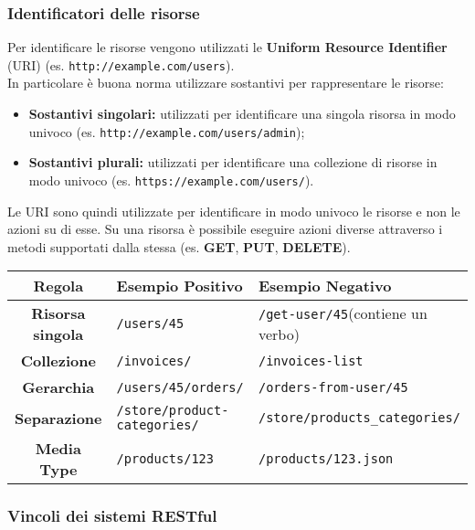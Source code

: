\documentclass[12pt]{article}
\begin{document}
\subsubsection{Identificatori delle risorse}
Per identificare le risorse vengono utilizzati le \textbf{Uniform Resource Identifier} (URI) (es. \texttt{http://example.com/users}).\\
In particolare è buona norma utilizzare sostantivi per rappresentare le risorse:
\begin{itemize}
  \item \textbf{Sostantivi singolari:} utilizzati per identificare una singola risorsa in modo univoco (es. \texttt{http://example.com/users/admin});
  \item \textbf{Sostantivi plurali:} utilizzati per identificare una collezione di risorse in modo univoco (es. \texttt{https://example.com/users/}).
\end{itemize}
Le URI sono quindi utilizzate per identificare in modo univoco le risorse e non le azioni su di esse.
Su una risorsa è possibile eseguire azioni diverse attraverso i metodi supportati dalla stessa (es. \textbf{GET}, \textbf{PUT}, \textbf{DELETE}).
\begin{center}
\begin{tabularx}{\textwidth}{ |c|X|X| }
\hline
\textbf{Regola} & \textbf{Esempio Positivo} & \textbf{Esempio Negativo}\\
\hline\hline
\textbf{Risorsa singola} & \texttt{/users/45} & \texttt{/get-user/45}\newline(contiene un verbo)\\
\hline
\textbf{Collezione} & \texttt{/invoices/} & \texttt{/invoices-list}\\
\hline
\textbf{Gerarchia} & \texttt{/users/45/orders/} & \texttt{/orders-from-user/45}\\
\hline
\textbf{Separazione} & \texttt{/store/product-categories/} & \texttt{/store/products\_categories/}\\
\hline
\textbf{Media Type} & \texttt{/products/123} & \texttt{/products/123.json}\\
\hline
\end{tabularx}
\end{center}

\subsubsection{Vincoli dei sistemi RESTful}
\end{document}
